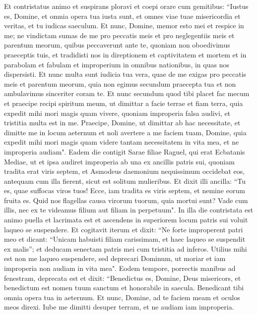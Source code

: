 \begin{biblechapter}  
\verse Et contristatus animo et suspirans ploravi et coepi orare cum gemitibus: 
\verse “Iustus es, Domine, et omnia opera tua iusta sunt, et omnes viae tuae misericordia et veritas, et tu iudicas saeculum. 
\verse Et nunc, Domine, memor esto mei et respice in me; ne vindictam sumas de me pro peccatis meis et pro neglegentiis meis et parentum meorum, quibus peccaverunt ante te, 
\verse quoniam non oboedivimus praeceptis tuis, et tradidisti nos in direptionem et captivitatem et mortem et in parabolam et fabulam et improperium in omnibus nationibus, in quas nos dispersisti. 
\verse Et nunc multa sunt iudicia tua vera, quae de me exigas pro peccatis meis et parentum meorum, quia non egimus secundum praecepta tua et non ambulavimus sinceriter coram te. 
\verse Et nunc secundum quod tibi placet fac mecum et praecipe recipi spiritum meum, ut dimittar a facie terrae et fiam terra, quia expedit mihi mori magis quam vivere, quoniam improperia falsa audivi, et tristitia multa est in me. Praecipe, Domine, ut dimittar ab hac necessitate, et dimitte me in locum aeternum et noli avertere a me faciem tuam, Domine, quia expedit mihi mori magis quam videre tantam necessitatem in vita mea, et ne improperia audiam". 
\verse Eadem die contigit Sarae filiae Raguel, qui erat Ecbatanis Mediae, ut et ipsa audiret improperia ab una ex ancillis patris sui, 
\verse quoniam tradita erat viris septem, et Asmodeus daemonium nequissimum occidebat eos, antequam cum illa fierent, sicut est solitum mulieribus. Et dixit illi ancilla: “Tu es, quae suffocas viros tuos! Ecce, iam tradita es viris septem, et nemine eorum fruita es. 
\verse Quid nos flagellas causa virorum tuorum, quia mortui sunt? Vade cum illis, nec ex te videamus filium aut filiam in perpetuum". 
\verse In illa die contristata est animo puella et lacrimata est et ascendens in superiorem locum patris sui voluit laqueo se suspendere. Et cogitavit iterum et dixit: “Ne forte improperent patri meo et dicant: “Unicam habuisti filiam carissimam, et haec laqueo se suspendit ex malis”; et deducam senectam patris mei cum tristitia ad inferos. Utilius mihi est non me laqueo suspendere, sed deprecari Dominum, ut moriar et iam improperia non audiam in vita mea". 
\verse Eodem tempore, porrectis manibus ad fenestram, deprecata est et dixit: “Benedictus es, Domine, Deus misericors, et benedictum est nomen tuum sanctum et honorabile in saecula. Benedicant tibi omnia opera tua in aeternum. 
\verse Et nunc, Domine, ad te faciem meam et oculos meos direxi. 
\verse Iube me dimitti desuper terram, et ne audiam iam improperia. 

\end{biblechapter}
